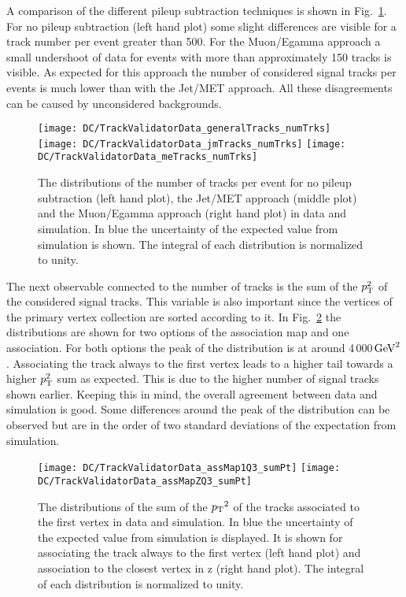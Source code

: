 A comparison of the different pileup subtraction techniques is shown in Fig.~\ref{plot:DCTVTDPUS}. For no pileup subtraction (left hand plot) some slight differences are visible for a track number per event greater than 500. For the Muon/Egamma approach a small undershoot of data for events with more than approximately 150 tracks is visible. As expected for this approach the number of considered signal tracks per events is much lower than with the Jet/MET approach. All these disagreements can be caused by unconsidered backgrounds.

\begin{figure}[Ht]
  \centering
  \texttt{[image: DC/TrackValidatorData\_generalTracks\_numTrks]}
  \texttt{[image: DC/TrackValidatorData\_jmTracks\_numTrks]}
  \texttt{[image: DC/TrackValidatorData\_meTracks\_numTrks]}
  \caption[Track number in data and simulation of the different pileup subtraction techniques]{The distributions of the number of tracks per event for no pileup subtraction (left hand plot), the Jet/MET approach (middle plot) and the Muon/Egamma approach (right hand plot) in data and simulation. In blue the uncertainty of the expected value from simulation is shown. The integral of each distribution is normalized to unity. \label{plot:DCTVTDPUS}}
\end{figure}

The next observable connected to the number of tracks is the sum of the $p_{\mathrm{T}}^{2}$ of the considered signal tracks. This variable is also important since the vertices of the primary vertex collection are sorted according to it. In Fig.~\ref{plot:DCTVSumPt} the distributions are shown for two options of the association map and one association. For both options the peak of the distribution is at around 4\,000$\,\text{Ge\hspace{-.08em}V}^{2}$. Associating the track always to the first vertex leads to a higher tail towards a higher $p_{\mathrm{T}}^{2}$ sum as expected. This is due to the higher number of signal tracks shown earlier. Keeping this in mind, the overall agreement between data and simulation is good. Some differences around the peak of the distribution can be observed but are in the order of two standard deviations of the expectation from simulation.

\begin{figure}[Ht]
  \centering
  \texttt{[image: DC/TrackValidatorData\_assMap1Q3\_sumPt]}
  \texttt{[image: DC/TrackValidatorData\_assMapZQ3\_sumPt]}
  \caption[Distribution of the first vertex $\pt{}^{2}$ in data and simulation of two options of the association map]{The distributions of the sum of the $\pt{}^{2}$ of the tracks associated to the first vertex in data and simulation. In blue the uncertainty of the expected value from simulation is displayed. It is shown for associating the track always to the first vertex (left hand plot) and association to the closest vertex in z (right hand plot). The integral of each distribution is normalized to unity. \label{plot:DCTVSumPt}}
\end{figure}

